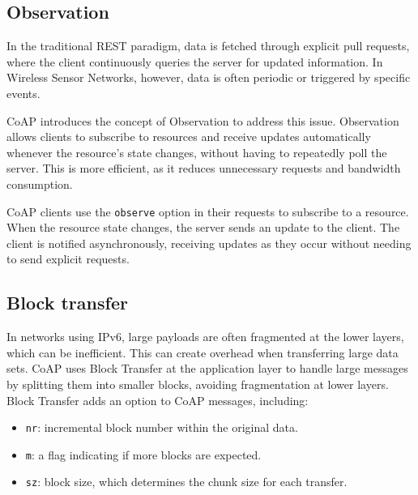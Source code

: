 \subsection{Observation}
In the traditional REST paradigm, data is fetched through explicit pull requests, where the client continuously queries the server for updated information.
In Wireless Sensor Networks, however, data is often periodic or triggered by specific events.

CoAP introduces the concept of Observation to address this issue. 
Observation allows clients to subscribe to resources and receive updates automatically whenever the resource's state changes, without having to repeatedly poll the server. 
This is more efficient, as it reduces unnecessary requests and bandwidth consumption.

CoAP clients use the \texttt{observe} option in their requests to subscribe to a resource.
When the resource state changes, the server sends an update to the client.
The client is notified asynchronously, receiving updates as they occur without needing to send explicit requests.

\subsection{Block transfer}
In networks using IPv6, large payloads are often fragmented at the lower layers, which can be inefficient. 
This can create overhead when transferring large data sets.
CoAP uses Block Transfer at the application layer to handle large messages by splitting them into smaller blocks, avoiding fragmentation at lower layers.
Block Transfer adds an option to CoAP messages, including:
\begin{itemize}
    \item \texttt{nr}: incremental block number within the original data.
    \item \texttt{m}: a flag indicating if more blocks are expected.
    \item \texttt{sz}: block size, which determines the chunk size for each transfer.
\end{itemize}

